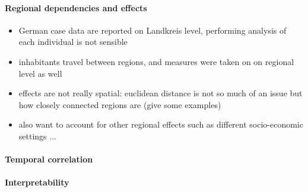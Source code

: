 \paragraph{Regional dependencies and effects}
\begin{itemize}
    \item German case data are reported on Landkreis level, performing analysis of each individual is not sensible 
    \item inhabitants travel between regions, and measures were taken on on regional level as well
    \item effects are not really spatial: euclidean distance is not so much of an issue but how closely connected regions are (give some examples)
    \item also want to account for other regional effects such as different socio-economic settings ... 
\end{itemize}

\paragraph{Temporal correlation}

\paragraph{Interpretability}